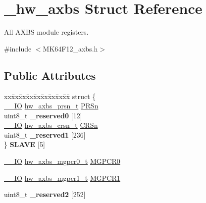\hypertarget{struct__hw__axbs}{}\section{\+\_\+hw\+\_\+axbs Struct Reference}
\label{struct__hw__axbs}


All A\+X\+BS module registers.  




{\ttfamily \#include $<$M\+K64\+F12\+\_\+axbs.\+h$>$}

\subsection*{Public Attributes}
\begin{DoxyCompactItemize}
\item 
\begin{tabbing}
xx\=xx\=xx\=xx\=xx\=xx\=xx\=xx\=xx\=\kill
struct \{\\
\>\hyperlink{core__sc300_8h_aec43007d9998a0a0e01faede4133d6be}{\_\_IO} \hyperlink{union__hw__axbs__prsn}{hw\_axbs\_prsn\_t} \hyperlink{struct__hw__axbs_a39b8662f17de0eb609cb38e43fbb8954}{PRSn}\\
\>uint8\_t {\bfseries \_reserved0} \mbox{[}12\mbox{]}\\
\>\hyperlink{core__sc300_8h_aec43007d9998a0a0e01faede4133d6be}{\_\_IO} \hyperlink{union__hw__axbs__crsn}{hw\_axbs\_crsn\_t} \hyperlink{struct__hw__axbs_a79216f59c8d8bf2684b750138ccb4d42}{CRSn}\\
\>uint8\_t {\bfseries \_reserved1} \mbox{[}236\mbox{]}\\
\} {\bfseries SLAVE} \mbox{[}5\mbox{]}\hypertarget{struct__hw__axbs_a270d06cf6b0e9e4f937e813e9c60214c}{}\label{struct__hw__axbs_a270d06cf6b0e9e4f937e813e9c60214c}
\\

\end{tabbing}\item 
\hyperlink{core__sc300_8h_aec43007d9998a0a0e01faede4133d6be}{\+\_\+\+\_\+\+IO} \hyperlink{union__hw__axbs__mgpcr0}{hw\+\_\+axbs\+\_\+mgpcr0\+\_\+t} \hyperlink{struct__hw__axbs_aaa24f09bac94facdf4f69323e52625a6}{M\+G\+P\+C\+R0}
\item 
\hyperlink{core__sc300_8h_aec43007d9998a0a0e01faede4133d6be}{\+\_\+\+\_\+\+IO} \hyperlink{union__hw__axbs__mgpcr1}{hw\+\_\+axbs\+\_\+mgpcr1\+\_\+t} \hyperlink{struct__hw__axbs_a4bbd821ae50de05c8f9dd5c7b5091376}{M\+G\+P\+C\+R1}
\item 
uint8\+\_\+t {\bfseries \+\_\+reserved2} \mbox{[}252\mbox{]}\hypertarget{struct__hw__axbs_a76f9b1ef9a4b34c7d0ea9e0f3c1c2c0f}{}\label{struct__hw__axbs_a76f9b1ef9a4b34c7d0ea9e0f3c1c2c0f}


\end{DoxyCompactItemize}
